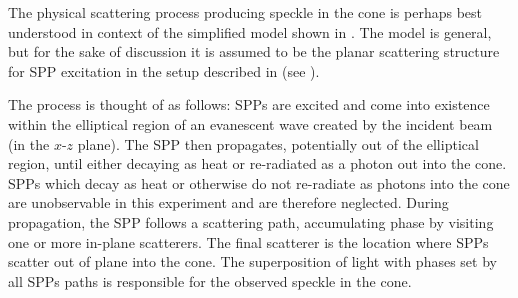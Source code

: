 The physical scattering process producing speckle in the cone is perhaps best
understood in context of the simplified model shown in
.  The model is general, but for the sake of
discussion it is assumed to be the planar scattering structure for SPP
excitation in the setup described in  (see
).

The process is thought of as follows: SPPs are excited and come into existence
within the elliptical region of an evanescent wave created by the incident
beam (in the $x$-$z$ plane).  The SPP then propagates, potentially out of the
elliptical region, until either decaying as heat or re-radiated as a photon
out into the cone.
SPPs which decay as heat or otherwise do not
re-radiate as photons into the cone are unobservable in this experiment and
are therefore neglected.  During propagation, the SPP follows a scattering
path, accumulating phase by visiting one or more in-plane scatterers.  The
final scatterer is the location where SPPs scatter out of plane into the cone.
The superposition of light with phases set by all SPPs paths is responsible
for the observed speckle in the cone.

